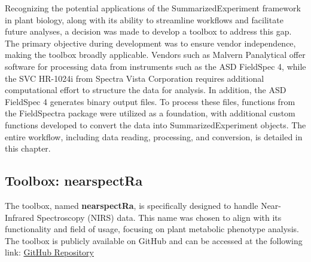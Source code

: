 \documentclass[12pt,a4paper]{article}
\begin{document}
Recognizing the potential applications of the SummarizedExperiment framework in plant biology, along with its ability to streamline workflows and facilitate future analyses, a decision was made to develop a toolbox to address this gap. The primary objective during development was to ensure vendor independence, making the toolbox broadly applicable. Vendors 
such as Malvern Panalytical offer software for processing data from instruments such as the ASD FieldSpec 4, while the SVC HR-1024i from Spectra Vista Corporation requires additional computational effort to structure the data for analysis.
In addition, the ASD FieldSpec 4 generates binary output files. To process these files, functions from the FieldSpectra package were utilized as a foundation, with additional custom functions developed to convert the data into SummarizedExperiment objects. The entire workflow, including data reading, processing, and conversion, is detailed in this chapter.\\


\subsection{Toolbox: nearspectRa}
The toolbox, named \textbf{nearspectRa}, is specifically designed to handle  Near-Infrared Spectroscopy (NIRS) data. This name was chosen to align with its functionality and field of usage, focusing on plant metabolic phenotype analysis. The toolbox is publicly available on GitHub and can be accessed at the following link: \href{https://github.com/georgejr45/nearspectRa}{GitHub Repository} \\
\end{document}
